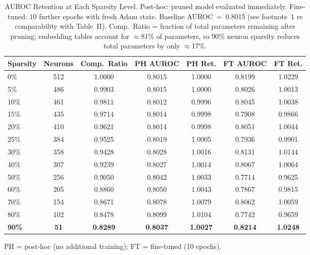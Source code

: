 \documentclass[journal]{IEEEtran}
\begin{document}
\begin{table}[!t]
  \caption{AUROC Retention at Each Sparsity Level. Post-hoc: pruned model
    evaluated immediately. Fine-tuned: 10 further epochs with fresh Adam state.
    Baseline AUROC~=~0.8015 (see footnote~1 re comparability with Table~II).
    Comp.\ Ratio = fraction of total parameters remaining after pruning;
    embedding tables account for $\approx$81\% of parameters, so 90\% neuron
    sparsity reduces total parameters by only $\approx$17\%.}
  \label{tab:pruning}
  \centering
  \small
  \begin{tabular}{lcccccc}
    \hline
    Sparsity & Neurons & Comp.\ Ratio & PH AUROC & PH Ret. & FT AUROC & FT Ret. \\
    \hline
    0\%            & 512           & 1.0000        & 0.8015        & 1.0000        & 0.8199        & 1.0229 \\
    5\%            & 486           & 0.9903        & 0.8015        & 1.0000        & 0.8026        & 1.0013 \\
    10\%           & 461           & 0.9811        & 0.8012        & 0.9996        & 0.8045        & 1.0038 \\
    15\%           & 435           & 0.9714        & 0.8014        & 0.9998        & 0.7908        & 0.9866 \\
    20\%           & 410           & 0.9621        & 0.8014        & 0.9998        & 0.8051        & 1.0044 \\
    25\%           & 384           & 0.9525        & 0.8019        & 1.0005        & 0.7936        & 0.9901 \\
    30\%           & 358           & 0.9428        & 0.8028        & 1.0016        & 0.8131        & 1.0144 \\
    40\%           & 307           & 0.9239        & 0.8027        & 1.0014        & 0.8067        & 1.0064 \\
    50\%           & 256           & 0.9050        & 0.8042        & 1.0033        & 0.7714        & 0.9625 \\
    60\%           & 205           & 0.8860        & 0.8050        & 1.0043        & 0.7867        & 0.9815 \\
    70\%           & 154           & 0.8671        & 0.8078        & 1.0079        & 0.8062        & 1.0059 \\
    80\%           & 102           & 0.8478        & 0.8099        & 1.0104        & 0.7742        & 0.9659 \\
    \textbf{90\%}  & \textbf{51}   & \textbf{0.8289} & \textbf{0.8037} & \textbf{1.0027} & \textbf{0.8214} & \textbf{1.0248} \\
    \hline
  \end{tabular}
  \smallskip

  \noindent\small PH = post-hoc (no additional training); FT = fine-tuned (10 epochs).
\end{table}
\end{document}
